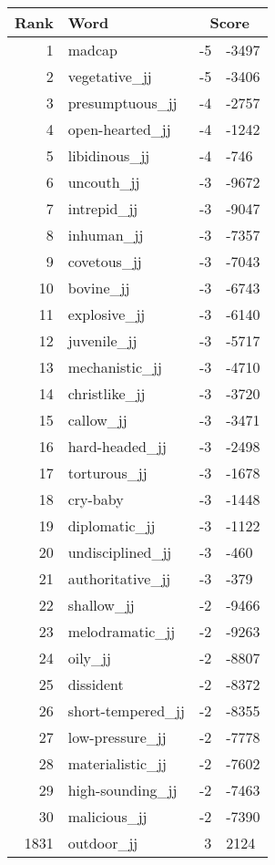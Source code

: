 \begin{longtable}[!htbp]{| rlr@{.}l |}
    \hline
    \textbf{Rank} & \textbf{Word} & \multicolumn{2}{c|}{\textbf{Score}} \\
    \hline
    \endhead
    1 & madcap & -5 & -3497 \\
    2 & vegetative\_jj & -5 & -3406 \\
    3 & presumptuous\_jj & -4 & -2757 \\
    4 & open-hearted\_jj & -4 & -1242 \\
    5 & libidinous\_jj & -4 & -746 \\
    6 & uncouth\_jj & -3 & -9672 \\
    7 & intrepid\_jj & -3 & -9047 \\
    8 & inhuman\_jj & -3 & -7357 \\
    9 & covetous\_jj & -3 & -7043 \\
    10 & bovine\_jj & -3 & -6743 \\
    11 & explosive\_jj & -3 & -6140 \\
    12 & juvenile\_jj & -3 & -5717 \\
    13 & mechanistic\_jj & -3 & -4710 \\
    14 & christlike\_jj & -3 & -3720 \\
    15 & callow\_jj & -3 & -3471 \\
    16 & hard-headed\_jj & -3 & -2498 \\
    17 & torturous\_jj & -3 & -1678 \\
    18 & cry-baby & -3 & -1448 \\
    19 & diplomatic\_jj & -3 & -1122 \\
    20 & undisciplined\_jj & -3 & -460 \\
    21 & authoritative\_jj & -3 & -379 \\
    22 & shallow\_jj & -2 & -9466 \\
    23 & melodramatic\_jj & -2 & -9263 \\
    24 & oily\_jj & -2 & -8807 \\
    25 & dissident & -2 & -8372 \\
    26 & short-tempered\_jj & -2 & -8355 \\
    27 & low-pressure\_jj & -2 & -7778 \\
    28 & materialistic\_jj & -2 & -7602 \\
    29 & high-sounding\_jj & -2 & -7463 \\
    30 & malicious\_jj & -2 & -7390 \\
    1831 & outdoor\_jj & 3 & 2124 \\

\end{longtable}
